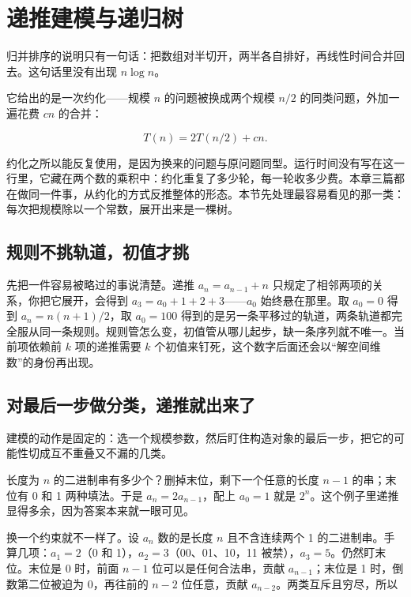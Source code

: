 \section{递推建模与递归树}
\label{sec:04-Discrete-Mathematics/02-Recurrences/01}

归并排序的说明只有一句话：把数组对半切开，两半各自排好，再线性时间合并回去。这句话里没有出现 \(n\log n\)。

它给出的是一次约化——规模 \(n\) 的问题被换成两个规模 \(n/2\) 的同类问题，外加一遍花费 \(cn\) 的合并：

\[
T(n)=2T(n/2)+cn.
\]

约化之所以能反复使用，是因为换来的问题与原问题同型。运行时间没有写在这一行里，它藏在两个数的乘积中：约化重复了多少轮，每一轮收多少费。本章三篇都在做同一件事，从约化的方式反推整体的形态。本节先处理最容易看见的那一类：每次把规模除以一个常数，展开出来是一棵树。

\subsection{规则不挑轨道，初值才挑}

先把一件容易被略过的事说清楚。递推 \(a_n=a_{n-1}+n\) 只规定了相邻两项的关系，你把它展开，会得到 \(a_3=a_0+1+2+3\)——\(a_0\) 始终悬在那里。取 \(a_0=0\) 得到 \(a_n=n(n+1)/2\)，取 \(a_0=100\) 得到的是另一条平移过的轨道，两条轨道都完全服从同一条规则。规则管怎么变，初值管从哪儿起步，缺一条序列就不唯一。当前项依赖前 \(k\) 项的递推需要 \(k\) 个初值来钉死，这个数字后面还会以``解空间维数''的身份再出现。

\subsection{对最后一步做分类，递推就出来了}

建模的动作是固定的：选一个规模参数，然后盯住构造对象的最后一步，把它的可能性切成互不重叠又不漏的几类。

长度为 \(n\) 的二进制串有多少个？删掉末位，剩下一个任意的长度 \(n-1\) 的串；末位有 0 和 1 两种填法。于是 \(a_n=2a_{n-1}\)，配上 \(a_0=1\) 就是 \(2^n\)。这个例子里递推显得多余，因为答案本来就一眼可见。

换一个约束就不一样了。设 \(a_n\) 数的是长度 \(n\) 且不含连续两个 1 的二进制串。手算几项：\(a_1=2\)（0 和 1），\(a_2=3\)（00、01、10，11 被禁），\(a_3=5\)。仍然盯末位。末位是 0 时，前面 \(n-1\) 位可以是任何合法串，贡献 \(a_{n-1}\)；末位是 1 时，倒数第二位被迫为 0，再往前的 \(n-2\) 位任意，贡献 \(a_{n-2}\)。两类互斥且穷尽，所以

